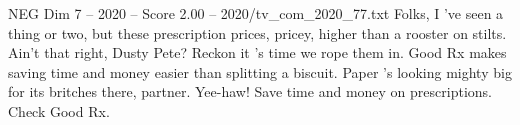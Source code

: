 \begin{textsample}{NEG Dim 7 – 2020 – Score 2.00 – 2020/tv\_com\_2020\_77.txt}  \label{ex:f7_neg_017}
Folks, I 've seen a thing or two, but these prescription prices, pricey, higher than a rooster on stilts.
Ain't that right, Dusty Pete?
Reckon it 's time we rope them in.
Good Rx makes saving time and money easier than splitting a biscuit.
Paper 's looking mighty big for its britches there, partner.
Yee-haw!
Save time and money on prescriptions.
Check Good Rx.

\end{textsample}
